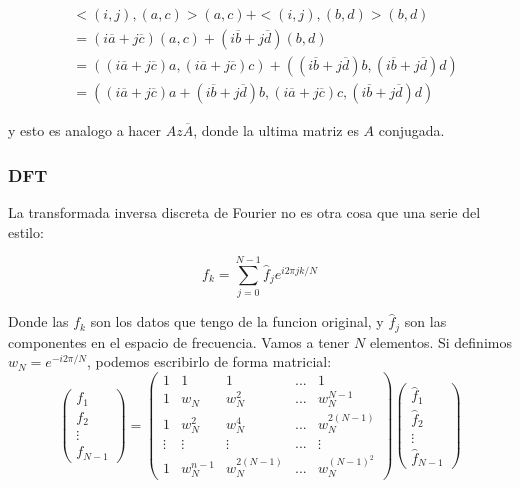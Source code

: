 \documentclass[12pt, oneside]{article}
\begin{document}
\begin{equation*}
    \begin{split}
        &<(i,j),(a,c)>(a,c) + <(i,j),(b,d)>(b,d) \\
        &=(i\overline{a} + j\overline{c})(a,c)+(i\overline{b} + j\overline{d})(b,d)\\
        &=((i\overline{a} + j\overline{c})a,(i\overline{a} + j\overline{c})c)+((i\overline{b} + j\overline{d})b,(i\overline{b} + j\overline{d})d)\\
        &= ((i\overline{a} + j\overline{c})a+(i\overline{b} + j\overline{d})b,(i\overline{a} + j\overline{c})c,(i\overline{b} + j\overline{d})d)
    \end{split}
    \label{eq:ej}
\end{equation*}

y esto es analogo a hacer $Az\overline{A}$, donde la ultima matriz es $A$ conjugada.


\subsubsection{DFT}
La transformada inversa discreta de Fourier no es otra cosa que una serie del estilo:

\begin{equation*}
    f_k = \sum_{j=0}^{N-1}\hat{f}_je^{i2\pi j k/N}
\end{equation*}

Donde las $f_k$ son los datos que tengo de la funcion original, y $\hat{f}_j$ son
las componentes en el espacio de frecuencia.
Vamos a tener $N$ elementos.
Si definimos $w_N=e^{-i2\pi/N}$, podemos escribirlo de forma matricial:
\begin{equation*}
    \begin{pmatrix}
         f_1 \\
         f_2 \\
        \vdots \\
          f_{N-1}
    \end{pmatrix}
    =
    \begin{pmatrix}
        1 & 1 &  1 & ... & 1 \\
        1 & w_N &  w_N^2 & ... & w_N^{N-1} \\
        1 & w_N^2 & w_N^4 & ... & w_N^{2(N-1)}\\
        \vdots & \vdots & \vdots & ... & \vdots\\
        1 & w_N^{n-1} & w_N^{2(N-1)} & ... & w_N^{(N-1)^2}
    \end{pmatrix}
    \label{eq:vandermonde}
    \begin{pmatrix}
        \hat{f}_1 \\
         \hat{f}_2 \\
        \vdots \\
          \hat{f}_{N-1}
    \end{pmatrix}
\end{equation*}
\end{document}
